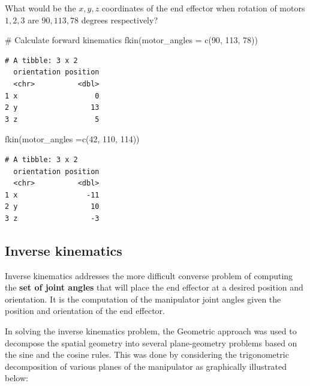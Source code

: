 \documentclass[
  letterpaper,
  DIV=11,
  numbers=noendperiod]{scrreprt}
\newenvironment{Shaded}{\begin{snugshade}}{\end{snugshade}}
\newcommand{\AttributeTok}[1]{\textcolor[rgb]{0.40,0.45,0.13}{#1}}
\newcommand{\CommentTok}[1]{\textcolor[rgb]{0.37,0.37,0.37}{#1}}
\newcommand{\DecValTok}[1]{\textcolor[rgb]{0.68,0.00,0.00}{#1}}
\newcommand{\FunctionTok}[1]{\textcolor[rgb]{0.28,0.35,0.67}{#1}}
\newcommand{\NormalTok}[1]{\textcolor[rgb]{0.00,0.23,0.31}{#1}}
\begin{document}
What would be the \(x, y, z\) coordinates of the end effector when
rotation of motors \(1, 2, 3\) are \(90, 113, 78\) degrees respectively?

\begin{Shaded}
\begin{Highlighting}[]
\CommentTok{\# Calculate forward kinematics}
\FunctionTok{fkin}\NormalTok{(}\AttributeTok{motor\_angles =} \FunctionTok{c}\NormalTok{(}\DecValTok{90}\NormalTok{, }\DecValTok{113}\NormalTok{, }\DecValTok{78}\NormalTok{))}
\end{Highlighting}
\end{Shaded}

\begin{verbatim}
# A tibble: 3 x 2
  orientation position
  <chr>          <dbl>
1 x                  0
2 y                 13
3 z                  5
\end{verbatim}

\begin{Shaded}
\begin{Highlighting}[]
\FunctionTok{fkin}\NormalTok{(}\AttributeTok{motor\_angles =}\FunctionTok{c}\NormalTok{(}\DecValTok{42}\NormalTok{, }\DecValTok{110}\NormalTok{, }\DecValTok{114}\NormalTok{))}
\end{Highlighting}
\end{Shaded}

\begin{verbatim}
# A tibble: 3 x 2
  orientation position
  <chr>          <dbl>
1 x                -11
2 y                 10
3 z                 -3
\end{verbatim}

\hypertarget{inverse-kinematics}{%
\subsection{Inverse kinematics}\label{inverse-kinematics}}

Inverse kinematics addresses the more difficult converse problem of
computing the \textbf{set of joint angles} that will place the end
effector at a desired position and orientation. It is the computation of
the manipulator joint angles given the position and orientation of the
end effector.

In solving the inverse kinematics problem, the Geometric approach was
used to decompose the spatial geometry into several plane-geometry
problems based on the sine and the cosine rules. This was done by
considering the trigonometric decomposition of various planes of the
manipulator as graphically illustrated below:
\end{document}
